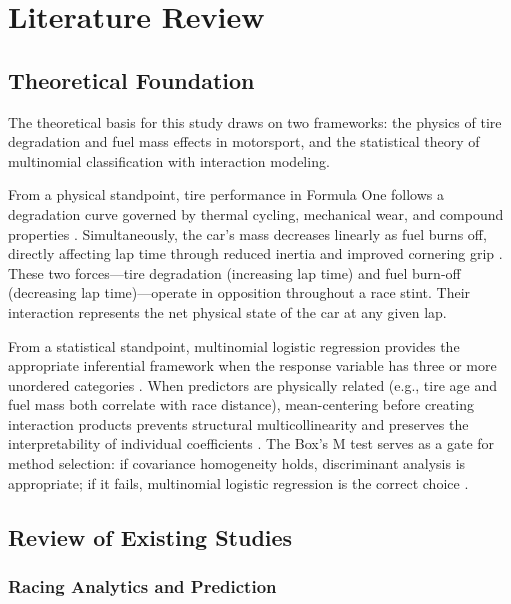 \section{Literature Review}

\subsection{Theoretical Foundation}

The theoretical basis for this study draws on two frameworks: the physics of
tire degradation and fuel mass effects in motorsport, and the statistical
theory of multinomial classification with interaction modeling.

From a physical standpoint, tire performance in Formula One follows a
degradation curve governed by thermal cycling, mechanical wear, and compound
properties \parencite{baldi2022}. Simultaneously, the car's mass decreases
linearly as fuel burns off, directly affecting lap time through reduced
inertia and improved cornering grip \parencite{oldknow2022fuel}. These two
forces---tire degradation (increasing lap time) and fuel burn-off (decreasing
lap time)---operate in opposition throughout a race stint. Their interaction
represents the net physical state of the car at any given lap.

From a statistical standpoint, multinomial logistic regression provides the
appropriate inferential framework when the response variable has three or more
unordered categories \parencite{agresti2013}. When predictors are physically
related (e.g., tire age and fuel mass both correlate with race distance),
mean-centering before creating interaction products prevents structural
multicollinearity and preserves the interpretability of individual
coefficients \parencite{hosmer2013}. The Box's M test serves as a gate for
method selection: if covariance homogeneity holds, discriminant analysis is
appropriate; if it fails, multinomial logistic regression is the correct
choice \parencite{tabachnick2019}.

\subsection{Review of Existing Studies}

\subsubsection{Racing Analytics and Prediction}

